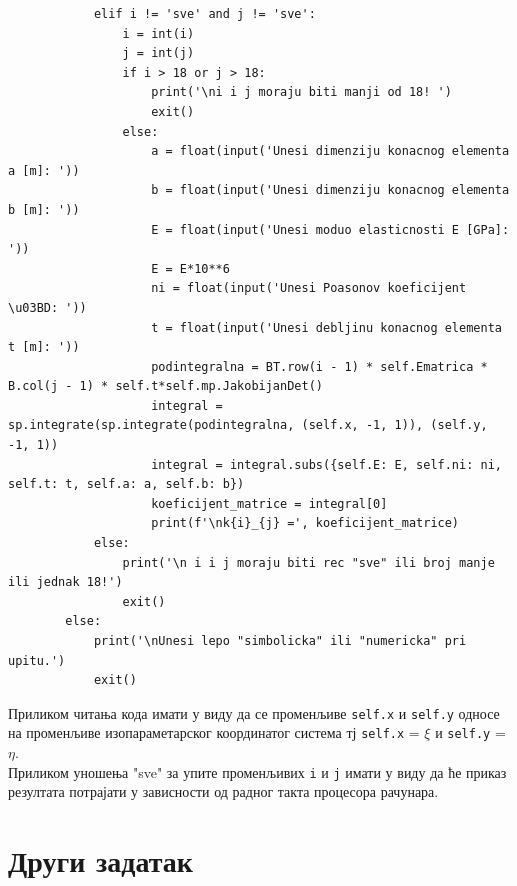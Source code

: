 \documentclass[11pt, a4paper]{article}
\begin{document}
\begin{lstlisting}
            elif i != 'sve' and j != 'sve':
                i = int(i)
                j = int(j)
                if i > 18 or j > 18:
                    print('\ni i j moraju biti manji od 18! ')
                    exit()
                else:
                    a = float(input('Unesi dimenziju konacnog elementa a [m]: '))
                    b = float(input('Unesi dimenziju konacnog elementa b [m]: '))
                    E = float(input('Unesi moduo elasticnosti E [GPa]: '))
                    E = E*10**6
                    ni = float(input('Unesi Poasonov koeficijent \u03BD: '))
                    t = float(input('Unesi debljinu konacnog elementa t [m]: '))
                    podintegralna = BT.row(i - 1) * self.Ematrica * B.col(j - 1) * self.t*self.mp.JakobijanDet()
                    integral = sp.integrate(sp.integrate(podintegralna, (self.x, -1, 1)), (self.y, -1, 1))
                    integral = integral.subs({self.E: E, self.ni: ni, self.t: t, self.a: a, self.b: b})
                    koeficijent_matrice = integral[0]
                    print(f'\nk{i}_{j} =', koeficijent_matrice)
            else:
                print('\n i i j moraju biti rec "sve" ili broj manje ili jednak 18!')
                exit()
        else:
            print('\nUnesi lepo "simbolicka" ili "numericka" pri upitu.')
            exit()

\end{lstlisting}
Приликом читања кода имати у виду да се променљиве \texttt{self.x} и \texttt{self.y} односе на променљиве изопараметарског координатог система тј \texttt{self.x} = $\xi$ и \texttt{self.y} = $\eta$.\\ Приликом уношења "sve" за упите променљивих \texttt{i} и \texttt{j} имати у виду да ће приказ резултата потрајати у зависности од радног такта процесора рачунара.
\newpage
\section{Други задатак}
\end{document}
